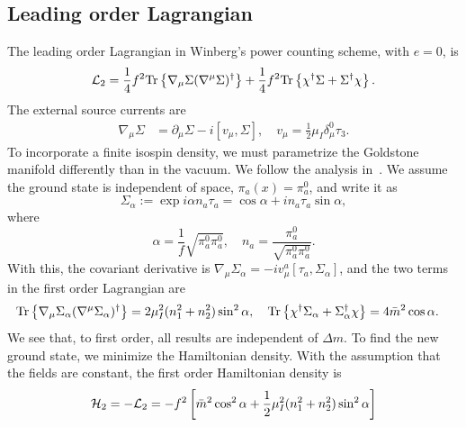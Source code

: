 \subsection{Leading order Lagrangian}
\label{section: leading order}

The leading order Lagrangian in Winberg's power counting scheme, with $e = 0$, is
%
\begin{equation}
    \label{leading order two-flavor chpt lagrangian}
    \mathcal{L}_2 = 
    \frac{1}{4} f^2 \text{Tr} \left\{ \nabla_\mu \Sigma (\nabla^\mu \Sigma)^\dagger \right\}
    + \frac{1}{4} f^2 \text{Tr} \left\{ \chi^\dagger \Sigma + \Sigma^\dagger \chi \right\}.
\end{equation}
%
The external source currents are
\begin{align}
    \nabla_\mu \Sigma &= \partial_\mu \Sigma - i [v_\mu, \Sigma],
    \quad v_\mu = \frac{1}{2} \mu_I \delta_\mu^0 \tau_3.
\end{align}
To incorporate a finite isospin density, we must parametrize the Goldstone manifold differently than in the vacuum.
We follow the analysis in~\autocite{adhikariTwoflavorChiralPerturbation2019}.
We assume the ground state is independent of space, $\pi_a(x) = \pi_a^0$, and write it as
\begin{equation}
    \Sigma_\alpha 
    :=
    \exp{i \alpha n_a \tau_a}
    = 
    \cos \alpha + i n_a \tau_a \sin \alpha,
\end{equation}
%
where
\begin{equation}
    \alpha = \frac{1}{f} \sqrt{\pi^0_a \pi^0_a}, \quad
    n_a = \frac{\pi^0_a}{\sqrt{\pi^0_a \pi^0_a}}.
\end{equation}
%
With this, the covariant derivative is $\nabla_\mu \Sigma_\alpha = - iv^a_\mu [\tau_a, \Sigma_\alpha]$, and the two terms in the first order Lagrangian are
\begin{align}
    \text{Tr} \left\{ \nabla_\mu \Sigma_\alpha  (\nabla^\mu \Sigma_\alpha)^\dagger \right\}
    & = 2 \mu_I^2 (n_1^2 + n_2^2) \sin^2 \alpha, \quad
    \text{Tr} \left\{ \chi^\dagger \Sigma_\alpha + \Sigma_\alpha^\dagger \chi \right\}
    = 4 \bar m^2 \cos \alpha.
\end{align}
%
We see that, to first order, all results are independent of $\Delta m$.
To find the new ground state, we minimize the Hamiltonian density.
With the assumption that the fields are constant, the first order Hamiltonian density is
\begin{equation}
    \mathcal{H}_2 = - \mathcal{L}_2 = 
    - f^2 
    \left[
        \bar m^2 \cos^2 \alpha 
        + \frac{1}{2} \mu_I^2 (n_1^2 + n_2^2 ) \sin^2 \alpha
    \right]
\end{equation}
